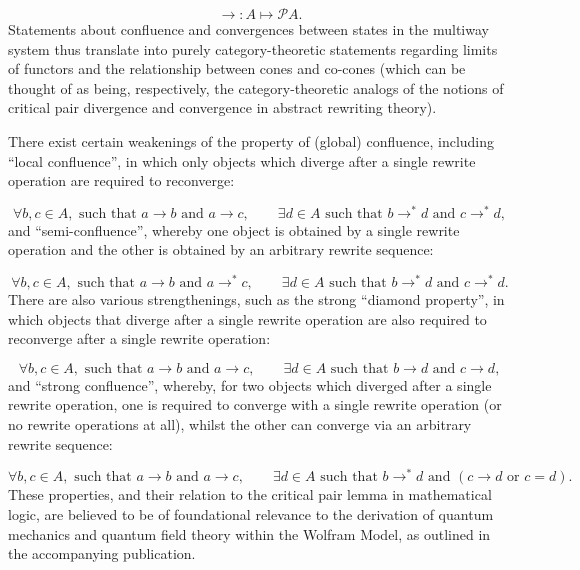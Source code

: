 \documentclass{article}
\begin{document}
\begin{equation}
\to : A \mapsto \mathcal{P} A.
\end{equation}
Statements about confluence and convergences between states in the multiway system thus translate into purely category-theoretic statements regarding limits of functors and the relationship between cones and co-cones (which can be thought of as being, respectively, the category-theoretic analogs of the notions of critical pair divergence and convergence in abstract rewriting theory)\cite{stokkermans}.

There exist certain weakenings of the property of (global) confluence, including ``local confluence'', in which only objects which diverge after a single rewrite operation are required to reconverge:

\begin{equation}
\forall b, c \in A, \text{ such that } a \to b \text{ and } a \to c, \qquad \exists d \in A \text{ such that } b \to^{*} d \text{ and } c \to^{*} d,
\end{equation}
and ``semi-confluence'', whereby one object is obtained by a single rewrite operation and the other is obtained by an arbitrary rewrite sequence:

\begin{equation}
\forall b, c \in A, \text{ such that } a \to b \text{ and } a \to^{*} c, \qquad \exists d \in A \text{ such that } b \to^{*} d \text{ and } c \to^{*} d.
\end{equation}
There are also various strengthenings, such as the strong ``diamond property'', in which objects that diverge after a single rewrite operation are also required to reconverge after a single rewrite operation:

\begin{equation}
\forall b, c \in A, \text{ such that } a \to b \text{ and } a \to c, \qquad \exists d \in A \text{ such that } b \to d \text{ and } c \to d,
\end{equation}
and ``strong confluence'', whereby, for two objects which diverged after a single rewrite operation, one is required to converge with a single rewrite operation (or no rewrite operations at all), whilst the other can converge via an arbitrary rewrite sequence:

\begin{equation}
\forall b, c \in A, \text{ such that } a \to b \text{ and } a \to c, \qquad \exists d \in A \text{ such that } b \to^{*} d \text{ and } \left( c \to d \text{ or } c = d \right).
\end{equation}
These properties, and their relation to the critical pair lemma in mathematical logic, are believed to be of foundational relevance to the derivation of quantum mechanics and quantum field theory within the Wolfram Model, as outlined in the accompanying publication\cite{gorard_new}.
\end{document}
